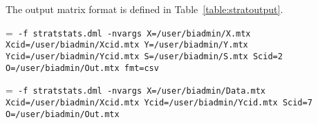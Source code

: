 \smallskip
{}
\smallskip

The output matrix format is defined in Table~\ref{table:stratoutput}.

\smallskip
{}
\smallskip

{\hangindent=\parindent\noindent\tt
\hml -f stratstats.dml -nvargs X=/user/biadmin/X.mtx Xcid=/user/biadmin/Xcid.mtx
  Y=/user/biadmin/Y.mtx Ycid=/user/biadmin/Ycid.mtx S=/user/biadmin/S.mtx Scid=2
  O=/user/biadmin/Out.mtx fmt=csv

}
{\hangindent=\parindent\noindent\tt
\hml -f stratstats.dml -nvargs X=/user/biadmin/Data.mtx Xcid=/user/biadmin/Xcid.mtx
  Ycid=/user/biadmin/Ycid.mtx Scid=7 O=/user/biadmin/Out.mtx

}

%

